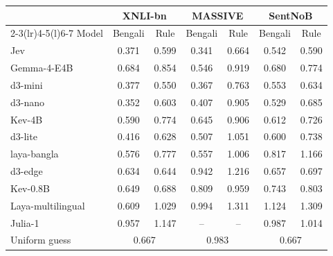 \begin{tabular}{@{}lcccccc@{}}\toprule
 & \multicolumn{2}{c}{XNLI-bn} & \multicolumn{2}{c}{MASSIVE} & \multicolumn{2}{c}{SentNoB} \\\cmidrule(lr){2-3}\cmidrule(lr){4-5}\cmidrule(l){6-7}
Model & Bengali & Rule & Bengali & Rule & Bengali & Rule \\\midrule
Jev & 0.371 & 0.599 & 0.341 & 0.664 & 0.542 & 0.590 \\
Gemma-4-E4B & 0.684 & 0.854 & 0.546 & 0.919 & 0.680 & 0.774 \\
d3-mini & 0.377 & 0.550 & 0.367 & 0.763 & 0.553 & 0.634 \\
d3-nano & 0.352 & 0.603 & 0.407 & 0.905 & 0.529 & 0.685 \\
Kev-4B & 0.590 & 0.774 & 0.645 & 0.906 & 0.612 & 0.726 \\
d3-lite & 0.416 & 0.628 & 0.507 & 1.051 & 0.600 & 0.738 \\
laya-bangla & 0.576 & 0.777 & 0.557 & 1.006 & 0.817 & 1.166 \\
d3-edge & 0.634 & 0.644 & 0.942 & 1.216 & 0.657 & 0.697 \\
Kev-0.8B & 0.649 & 0.688 & 0.809 & 0.959 & 0.743 & 0.803 \\
Laya-multilingual & 0.609 & 1.029 & 0.994 & 1.311 & 1.124 & 1.309 \\
Julia-1 & 0.957 & 1.147 & -- & -- & 0.987 & 1.014 \\
\midrule
Uniform guess & \multicolumn{2}{c}{0.667} & \multicolumn{2}{c}{0.983} & \multicolumn{2}{c}{0.667} \\
\bottomrule\end{tabular}
